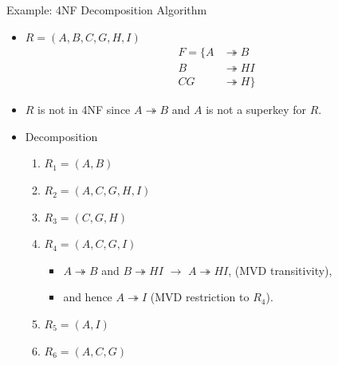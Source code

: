 \documentclass[aspectratio=169]{beamer}
\begin{document}
\begin{frame}{Example: 4NF Decomposition Algorithm}
    \footnotesize
    \begin{itemize}
        \item $R =(A, B, C, G, H, I)$ \\
            \begin{equation*}
                \begin{align*}
                    F = \{  A  &\twoheadrightarrow B  \\
                            B  &\twoheadrightarrow HI \\
                            CG &\twoheadrightarrow H \}
                \end{align*}
            \end{equation*}

        \item $R$ is not in 4NF since $A \twoheadrightarrow B$ and $A$ is not a superkey for $R$.

        \item Decomposition
            \begin{enumerate}
                \item $R_1 = (A, B)$            \quad [$R_1$ is in 4NF] \pause
                \item $R_2 = (A, C, G, H, I)$    \pause
                \item $R_3 = (C, G, H)$         \quad [$R_3$ is in 4NF] \pause
                \item $R_4 = (A, C, G, I)$       \pause
                    \begin{itemize}
                        \item $A \twoheadrightarrow B$ and $B \twoheadrightarrow HI$ $\longrightarrow$ $A \twoheadrightarrow HI$, (MVD transitivity),
                        \item and hence $A \twoheadrightarrow I$ (MVD restriction to $R_4$). \pause
                    \end{itemize}
                \item $R_5 = (A, I)$            \quad [$R_5$ is in 4NF] \pause
                \item $R_6 = (A, C, G)$         \quad [$R_6$ is in 4NF]
            \end{enumerate}
    \end{itemize}
\end{frame}
\end{document}
